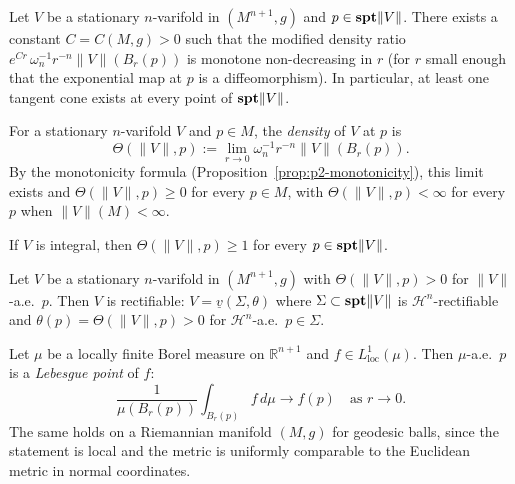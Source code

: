 \begin{proposition}\label{prop:p2-monotonicity}
Let $V$ be a stationary $n$-varifold in $(M^{n+1}, g)$ and $p \in \mathbf{spt}\|V\|$. There exists a constant $C = C(M, g) > 0$ such that the modified density ratio $e^{Cr}\, \omega_n^{-1} r^{-n} \|V\|(B_r(p))$ is monotone non-decreasing in $r$ (for $r$ small enough that the exponential map at $p$ is a diffeomorphism). In particular, at least one tangent cone exists at every point of $\mathbf{spt}\|V\|$.
\end{proposition}

\begin{definition}\label{def:p2-density}
For a stationary $n$-varifold $V$ and $p \in M$, the \emph{density} of $V$ at $p$ is
\[
\Theta(\|V\|, p) := \lim_{r \to 0} \omega_n^{-1} r^{-n} \|V\|(B_r(p)).
\]
By the monotonicity formula (Proposition~\ref{prop:p2-monotonicity}), this limit exists and $\Theta(\|V\|, p) \geq 0$ for every $p \in M$, with $\Theta(\|V\|, p) < \infty$ for every $p$ when $\|V\|(M) < \infty$.

If $V$ is integral, then $\Theta(\|V\|, p) \geq 1$ for every $p \in \mathbf{spt}\|V\|$.
\end{definition}

\begin{proposition}\label{prop:allard-rectifiability}
Let $V$ be a stationary $n$-varifold in $(M^{n+1}, g)$ with $\Theta(\|V\|, p) > 0$ for $\|V\|$-a.e.\ $p$. Then $V$ is rectifiable: $V = \underline{v}(\Sigma, \theta)$ where $\Sigma \subset \mathbf{spt}\|V\|$ is $\mathcal{H}^n$-rectifiable and $\theta(p) = \Theta(\|V\|, p) > 0$ for $\mathcal{H}^n$-a.e.\ $p \in \Sigma$.
\end{proposition}

\begin{theorem}\label{thm:lebesgue-besicovitch}
Let $\mu$ be a locally finite Borel measure on $\mathbb{R}^{n+1}$ and $f \in L^1_{\mathrm{loc}}(\mu)$. Then $\mu$-a.e.\ $p$ is a \emph{Lebesgue point} of $f$:
\[
    \frac{1}{\mu(B_r(p))}\int_{B_r(p)} f\,d\mu \to f(p) \quad \text{as } r \to 0.
\]
The same holds on a Riemannian manifold $(M, g)$ for geodesic balls, since the statement is local and the metric is uniformly comparable to the Euclidean metric in normal coordinates.
\end{theorem}

